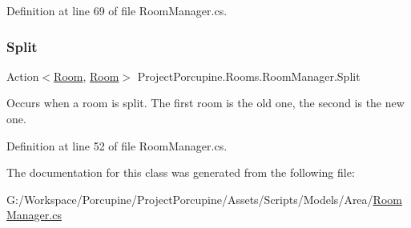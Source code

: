 Definition at line 69 of file Room\+Manager.\+cs.

\mbox{\label{class_project_porcupine_1_1_rooms_1_1_room_manager_ad8eb00af1baebf4e31bc07b1e0244a7a}} 
\subsubsection{\texorpdfstring{Split}{Split}}
{\footnotesize\ttfamily Action$<$\hyperlink{class_project_porcupine_1_1_rooms_1_1_room}{Room}, \hyperlink{class_project_porcupine_1_1_rooms_1_1_room}{Room}$>$ Project\+Porcupine.\+Rooms.\+Room\+Manager.\+Split}



Occurs when a room is split. The first room is the old one, the second is the new one. 



Definition at line 52 of file Room\+Manager.\+cs.



The documentation for this class was generated from the following file\+:\begin{DoxyCompactItemize}
\item 
G\+:/\+Workspace/\+Porcupine/\+Project\+Porcupine/\+Assets/\+Scripts/\+Models/\+Area/\hyperlink{_room_manager_8cs}{Room\+Manager.\+cs}\end{DoxyCompactItemize}
